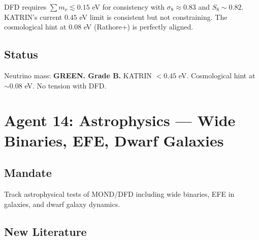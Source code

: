 \documentclass[11pt,a4paper]{article}
\begin{document}
DFD requires $\sum m_\nu \lesssim 0.15$ eV for consistency with $\sigma_8 \approx 0.83$ and $S_8 \sim 0.82$. KATRIN's current $0.45$ eV limit is consistent but not constraining. The cosmological hint at $0.08$ eV (Rathore+) is perfectly aligned.

\subsection{Status}
Neutrino mass: \textbf{GREEN. Grade B.} KATRIN $< 0.45$ eV. Cosmological hint at $\sim$0.08 eV. No tension with DFD.

\section{Agent 14: Astrophysics --- Wide Binaries, EFE, Dwarf Galaxies}

\subsection{Mandate}
Track astrophysical tests of MOND/DFD including wide binaries, EFE in galaxies, and dwarf galaxy dynamics.

\subsection{New Literature}
\end{document}
